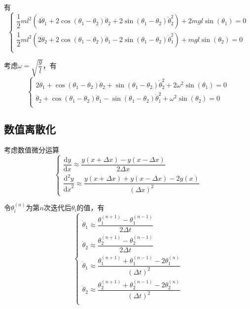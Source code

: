 \documentclass[UTF8]{ctexart}
\newcommand{\rmd}{\mathrm{d}}
\begin{document}
			有
			\begin{equation}
				\begin{cases}
					\dfrac{1}{2} m l^2 \left(4 \ddot{\theta}_{1} + 2 \cos(\theta_{1} - \theta_{2}) \ddot{\theta}_{2} + 2 \sin(\theta_{1} - \theta_{2}) \dot{\theta}_{2}^{2}\right) + 2 m g l \sin(\theta_1) = 0    \\
					\dfrac{1}{2} m l^2 \left(2 \ddot{\theta}_{2} + 2 \cos(\theta_{1} - \theta_{2}) \ddot{\theta}_{1} - 2 \sin(\theta_{1} - \theta_{2}) \dot{\theta}_{1}^{2}\right) +   m g l \sin(\theta_2) = 0    \\
				\end{cases}
			\end{equation}

			考虑$\omega = \sqrt{\dfrac{g}{l}}$，有
			\begin{equation}
				\begin{cases}
					2 \ddot{\theta}_{1} + \cos(\theta_{1} - \theta_{2}) \ddot{\theta}_{2} + \sin(\theta_{1} - \theta_{2}) \dot{\theta}_{2}^{2} + 2 \omega^{2} \sin(\theta_1) = 0    \\
					\ddot{\theta}_{2} + \cos(\theta_{1} - \theta_{2}) \ddot{\theta}_{1} - \sin(\theta_{1} - \theta_{2}) \dot{\theta}_{1}^{2} +   \omega^{2} \sin(\theta_2) = 0    \\
				\end{cases}
				\label{eq:double-pendulum}
			\end{equation}

			\newpage

		\subsection{数值离散化}
			考虑数值微分运算
			\begin{equation}
				\begin{cases}
					\dfrac{\rmd y}{\rmd x}           \approx \dfrac{y(x + \Delta x) - y(x - \Delta x)}         {2 \Delta x}\\
					\dfrac{\rmd^{2} y}{{\rmd x}^{2}} \approx \dfrac{y(x + \Delta x) + y(x - \Delta x) - 2 y(x)}{(\Delta x)^{2}}
				\end{cases}
			\end{equation}

			令$\theta_{i}^{(n)}$为第$n$次迭代后$\theta_{i}$的值，有
			\begin{equation}
				\begin{cases}
					\dot{\theta}_{1}  \approx \dfrac{\theta_{1}^{(n + 1)} - \theta_{1}^{(n - 1)}}                     { 2 \Delta t}      \\
					\dot{\theta}_{2}  \approx \dfrac{\theta_{2}^{(n + 1)} - \theta_{2}^{(n - 1)}}                     { 2 \Delta t}      \\
					\ddot{\theta}_{1} \approx \dfrac{\theta_{1}^{(n + 1)} + \theta_{1}^{(n - 1)} - 2 \theta_{1}^{(n)}}{(\Delta t)^{2}} \\
					\ddot{\theta}_{2} \approx \dfrac{\theta_{2}^{(n + 1)} + \theta_{2}^{(n - 1)} - 2 \theta_{2}^{(n)}}{(\Delta t)^{2}} \\
				\end{cases}
			\end{equation}
\end{document}
